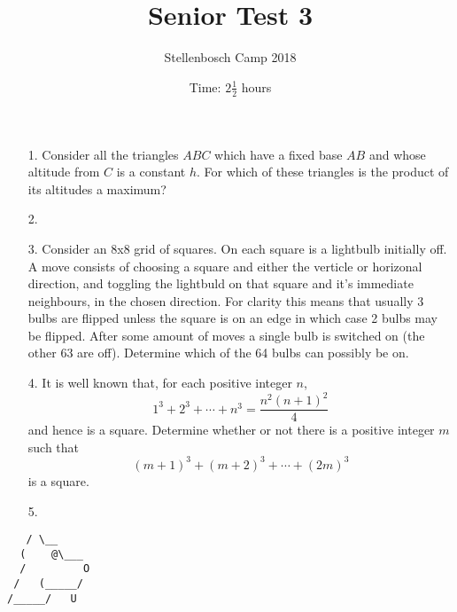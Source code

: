 \documentclass[a4paper, 12pt]{article}
\title{Senior Test 3}
\author{Stellenbosch Camp 2018}
\date{Time: $2 \frac{1}{2}$ hours}
\begin{document}
 \maketitle

\begin{enumerate}

\item[1.] Consider all the triangles $ABC$ which have a fixed base $AB$ and whose altitude from $C$ is a constant $h$. For which of these triangles is the product of its altitudes a maximum? 


\vspace{12pt}
% 
\item[2.]  



\vspace{12pt}
\item[3.]
Consider an 8x8 grid of squares. On each square is a lightbulb initially off. A move consists of choosing a square and either the verticle or horizonal direction, and toggling the lightbuld on that square and it's immediate neighbours, in the chosen direction. For clarity this means that usually 3 bulbs are flipped unless the square is on an edge in which case 2 bulbs may be flipped. After some amount of moves a single bulb is switched on (the other 63 are off). Determine which of the 64 bulbs can possibly be on. 


\vspace{12pt}
\item[4.]
It is well known that, for each positive integer $n$, \[ 1^3 +2^3 +\dotsb +n^3 = \frac{n^2(n+1)^2}{4} \] and hence is a square. Determine whether or not there is a positive integer $m$ such that \[ (m+1)^3 +(m+2)^3 +\dotsb +(2m)^3 \] is a square.


\vspace{12pt}
% 
\item[5.]


\end{enumerate}

\vfill

\centering
\begin{BVerbatim}
   / \__
  (    @\___
  /         O
 /   (_____/
/_____/   U
\end{BVerbatim}

\vspace{12mm}
\end{document}
